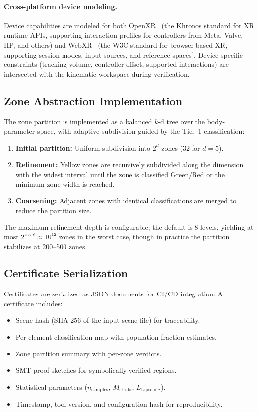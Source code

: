 \documentclass[11pt,letterpaper]{article}
\begin{document}
\paragraph{Cross-platform device modeling.}
Device capabilities are modeled for both OpenXR~\cite{openxr} (the Khronos standard for XR runtime APIs, supporting interaction profiles for controllers from Meta, Valve, HP, and others) and WebXR~\cite{w3c-webxr} (the W3C standard for browser-based XR, supporting session modes, input sources, and reference spaces).
Device-specific constraints (tracking volume, controller offset, supported interactions) are intersected with the kinematic workspace during verification.

\subsection{Zone Abstraction Implementation}

The zone partition is implemented as a balanced $k$-d tree over the body-parameter space, with adaptive subdivision guided by the Tier~1 classification:
\begin{enumerate}[nosep]
  \item \textbf{Initial partition:} Uniform subdivision into $2^d$ zones (32 for $d=5$).
  \item \textbf{Refinement:} Yellow zones are recursively subdivided along the dimension with the widest interval until the zone is classified Green/Red or the minimum zone width is reached.
  \item \textbf{Coarsening:} Adjacent zones with identical classifications are merged to reduce the partition size.
\end{enumerate}

The maximum refinement depth is configurable; the default is 8 levels, yielding at most $2^{5 \times 8} \approx 10^{12}$ zones in the worst case, though in practice the partition stabilizes at 200--500 zones.

\subsection{Certificate Serialization}

Certificates are serialized as JSON documents for CI/CD integration.
A certificate includes:
\begin{itemize}[nosep]
  \item Scene hash (SHA-256 of the input scene file) for traceability.
  \item Per-element classification map with population-fraction estimates.
  \item Zone partition summary with per-zone verdicts.
  \item SMT proof sketches for symbolically verified regions.
  \item Statistical parameters ($n_{\text{samples}}$, $M_{\text{strata}}$, $L_{\text{Lipschitz}}$).
  \item Timestamp, tool version, and configuration hash for reproducibility.
\end{itemize}
\end{document}
